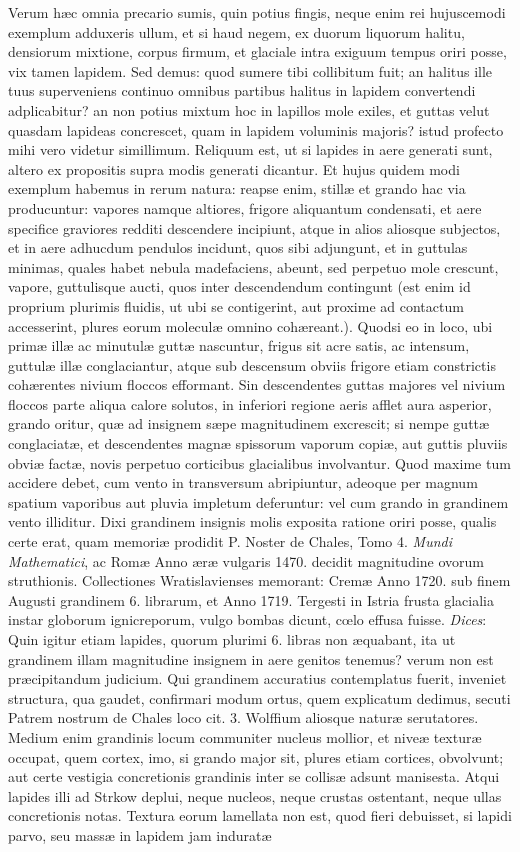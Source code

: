 \documentclass[a4paper, 11pt, oneside, polutonikogreek, latin]{article}
\begin{document}
Verum hæc omnia precario sumis, quin potius fingis, neque enim rei hujuscemodi exemplum adduxeris ullum, et si haud negem, ex duorum liquorum halitu, densiorum mixtione, corpus firmum, et glaciale intra exiguum tempus oriri posse, vix tamen lapidem. Sed demus: quod sumere tibi collibitum fuit; an halitus ille tuus superveniens continuo omnibus partibus halitus in lapidem convertendi adplicabitur? an non potius mixtum hoc in lapillos mole exiles, et guttas velut quasdam lapideas concrescet, quam in lapidem voluminis majoris? istud profecto mihi vero videtur simillimum. Reliquum est, ut si lapides in aere generati sunt, altero ex propositis supra modis generati dicantur. Et hujus quidem modi exemplum habemus in rerum natura: reapse enim, stillæ et grando hac via producuntur: vapores namque altiores, frigore aliquantum condensati, et aere specifice graviores redditi descendere incipiunt, atque in alios aliosque subjectos, et in aere adhucdum  pendulos incidunt, quos sibi adjungunt, et in guttulas minimas, quales habet nebula madefaciens, abeunt, sed perpetuo mole crescunt, vapore, guttulisque aucti, quos inter descendendum contingunt (est enim id proprium plurimis fluidis, ut ubi se contigerint, aut proxime ad contactum accesserint, plures eorum moleculæ omnino cohæreant.). Quodsi eo in loco, ubi primæ illæ ac minutulæ guttæ nascuntur, frigus sit acre satis, ac intensum, guttulæ illæ conglaciantur, atque sub descensum obviis frigore etiam constrictis cohærentes nivium floccos efformant. Sin descendentes guttas majores vel nivium floccos parte aliqua calore solutos, in inferiori regione aeris afflet aura asperior, grando oritur, quæ ad insignem sæpe magnitudinem excrescit; si nempe guttæ conglaciatæ, et descendentes magnæ spissorum vaporum copiæ, aut guttis pluviis obviæ factæ, novis perpetuo corticibus glacialibus involvantur. Quod maxime tum accidere debet, cum vento in transversum abripiuntur, adeoque per magnum spatium vaporibus aut pluvia impletum deferuntur: vel cum grando in grandinem vento illiditur. Dixi grandinem insignis molis exposita ratione oriri posse, qualis certe erat, quam memoriæ prodidit P. Noster de Chales, Tomo 4. \emph{Mundi Mathematici}, ac Romæ Anno æræ vulgaris 1470. decidit magnitudine ovorum struthionis. Collectiones Wratislavienses memorant: Cremæ Anno 1720. sub finem Augusti grandinem 6. librarum, et Anno 1719. Tergesti in Istria frusta glacialia instar globorum ignicreporum, vulgo bombas dicunt, cœlo effusa fuisse. \emph{Dices}: Quin igitur etiam lapides, quorum plurimi 6. libras non æquabant, ita ut grandinem illam magnitudine insignem in aere genitos tenemus? verum non est præcipitandum judicium. Qui grandinem accuratius contemplatus fuerit, inveniet structura, qua gaudet, confirmari modum ortus, quem explicatum dedimus, secuti Patrem nostrum de Chales loco cit. 3. Wolffium aliosque naturæ serutatores. Medium enim grandinis locum communiter nucleus mollior, et niveæ texturæ occupat, quem cortex, imo, si grando major sit, plures etiam cortices, obvolvunt; aut certe vestigia concretionis grandinis inter se collisæ adsunt manisesta. Atqui lapides illi ad Strkow deplui, neque nucleos, neque crustas ostentant, neque ullas concretionis notas. Textura eorum lamellata non est, quod fieri debuisset, si lapidi parvo, seu massæ in lapidem jam induratæ 
\end{document}
